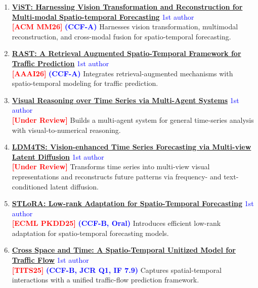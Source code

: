 \begin{enumerate}

\item \textbf{\href{https://openreview.net/forum?id=1WEyvT5Yvg}{ViST: Harnessing Vision Transformation and Reconstruction for Multi-modal Spatio-temporal Forecasting}}
\hfill \textcolor{blue}{1st author} \\
\textbf{\textcolor{red}{[ACM MM26]}}
\textbf{\textcolor{blue}{(CCF-A)}}
Harnesses vision transformation, multimodal reconstruction, and cross-modal fusion for spatio-temporal forecasting.

\item \textbf{\href{https://arxiv.org/abs/2508.16623}{RAST: A Retrieval Augmented Spatio-Temporal Framework for Traffic Prediction}}
\hfill \textcolor{blue}{1st author} \\
\textbf{\textcolor{red}{[AAAI26]}} 
\textbf{\textcolor{blue}{(CCF-A)}}
Integrates retrieval-augmented mechanisms with spatio-temporal modeling for traffic prediction.

\item \textbf{\href{https://arxiv.org/abs/2602.03026}{Visual Reasoning over Time Series via Multi-Agent Systems}}
\hfill \textcolor{blue}{1st author} \\
\textbf{\textcolor{red}{[Under Review]}}
Builds a multi-agent system for general time-series analysis with visual-to-numerical reasoning.

\item \textbf{\href{https://arxiv.org/abs/2502.14887}{LDM4TS: Vision-enhanced Time Series Forecasting via Multi-view Latent Diffusion}}
\hfill \textcolor{blue}{1st author} \\
\textbf{\textcolor{red}{[Under Review]}} 
Transforms time series into multi-view visual representations and reconstructs future patterns via frequency- and text-conditioned latent diffusion.

\item \textbf{\href{https://arxiv.org/abs/2404.07919}{STLoRA: Low-rank Adaptation for Spatio-Temporal Forecasting}} \hfill \textcolor{blue}{1st author} \\
\textbf{\textcolor{red}{[ECML PKDD25]}}
\textbf{\textcolor{blue}{(CCF-B, Oral)}}
Introduces efficient low-rank adaptation for spatio-temporal forecasting models.

\item \textbf{\href{https://ieeexplore.ieee.org/abstract/document/11173261/}{Cross Space and Time: A Spatio-Temporal Unitized Model for Traffic Flow}} \hfill \textcolor{blue}{1st author} \\
\textbf{\textcolor{red}{[TITS25]}}
\textbf{\textcolor{blue}{(CCF-B, JCR Q1, IF 7.9)}}
Captures spatial-temporal interactions with a unified traffic-flow prediction framework.


\end{enumerate}
